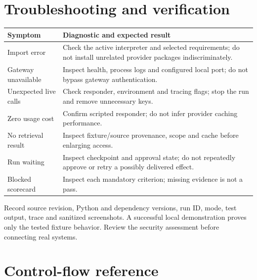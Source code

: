 \documentclass[11pt,letterpaper]{article}
\begin{document}
\section{Troubleshooting and verification}
\begin{longtable}{>{\raggedright\arraybackslash}p{.27\linewidth}>{\raggedright\arraybackslash}p{.64\linewidth}}\toprule
Symptom & Diagnostic and expected result \\\midrule\endhead
Import error & Check the active interpreter and selected requirements; do not install unrelated provider packages indiscriminately. \\
Gateway unavailable & Inspect health, process logs and configured local port; do not bypass gateway authentication. \\
Unexpected live calls & Check responder, environment and tracing flags; stop the run and remove unnecessary keys. \\
Zero usage cost & Confirm scripted responder; do not infer provider caching performance. \\
No retrieval result & Inspect fixture/source provenance, scope and cache before enlarging access. \\
Run waiting & Inspect checkpoint and approval state; do not repeatedly approve or retry a possibly delivered effect. \\
Blocked scorecard & Inspect each mandatory criterion; missing evidence is not a pass. \\
\bottomrule\end{longtable}
Record source revision, Python and dependency versions, run ID, mode, test output, trace and sanitized screenshots. A successful local demonstration proves only the tested fixture behavior. Review the security assessment before connecting real systems.

\section{Control-flow reference}
\end{document}
